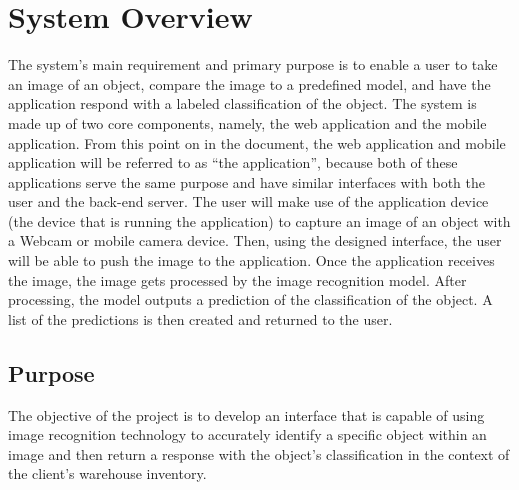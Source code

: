 \documentclass[a4paper, 11pt]{article}
\begin{document}
\section{System Overview}
The system’s main requirement and primary purpose is to enable a user to take an image of an object, compare the image to a predefined model, and have the application respond with a labeled classification of the object.
\linebreak
\linebreak
The system is made up of two core components, namely, the web application and the mobile application. From this point on in the document, the web application and mobile application will be referred to as “the application”, because both of these applications serve the same purpose and have similar interfaces with both the user and the back-end server.
\linebreak
\linebreak 
The user will make use of the application device (the device that is running the application) to capture an image of an object with a Webcam or mobile camera device. Then, using the designed interface, the user will be able to push the image to the application.
Once the application receives the image, the image gets processed by the image recognition model. After processing, the model outputs a prediction of the classification of the object. A list of the predictions is then created and returned to the user.
\subsection{Purpose}
\begin{flushleft}
The objective of the project is to develop an interface that is capable of using image recognition technology to accurately identify a specific object within an image and then return a response with the object’s classification in the context of the client’s warehouse inventory.
\end{flushleft}

\pagebreak
\end{document}
